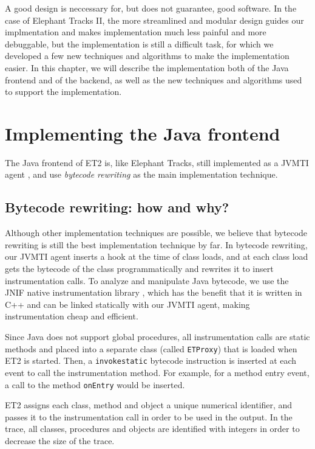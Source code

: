 A good design is neccessary for, but does not guarantee, good software. In the case of Elephant Tracks II, the more streamlined
and modular design guides our implmentation and makes implementation much less painful and more debuggable, but the implementation
is still a difficult task, for which we developed a few new techniques and algorithms to make the implementation easier. In this
chapter, we will describe the implementation both of the Java frontend and of the backend, as well as the new techniques and
algorithms used to support the implementation.

\section{Implementing the Java frontend}
The Java frontend of ET2 is, like Elephant Tracks, still implemented as a JVMTI agent \citep{JVMTI}, and use \emph{bytecode rewriting}
as the main implementation technique.

\subsection{Bytecode rewriting: how and why?}
Although other implementation techniques are possible, we believe that bytecode rewriting is still the best implementation technique by
far. In bytecode rewriting, our JVMTI agent inserts a hook at the time of class loads, and at each class load gets the bytecode of the
class programmatically and rewrites it to insert instrumentation calls. To analyze and manipulate Java bytecode, we use the JNIF native
instrumentation library \citep{JNIF}, which has the benefit that it is written in C++ and can be linked statically with our JVMTI agent,
making instrumentation cheap and efficient.

Since Java does not support global procedures, all instrumentation calls are static methods and placed into a separate class
(called \lstinline{ETProxy}) that is loaded when ET2 is started. Then, a \lstinline{invokestatic} bytecode instruction is inserted at each
event to call the instrumentation method. For example, for a method entry event, a call to the method \lstinline{onEntry} would be inserted.

ET2 assigns each class, method and object a unique numerical identifier, and passes it to the instrumentation call in order to be used in the
output. In the trace, all classes, procedures and objects are identified with integers in order to decrease the size of the trace.

